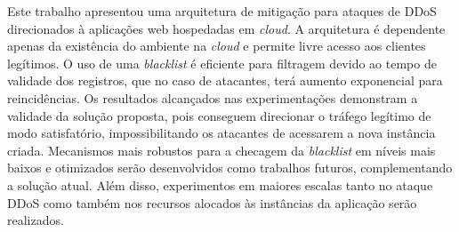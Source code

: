 
Este trabalho apresentou uma arquitetura de mitigação para ataques de DDoS direcionados à aplicações web hospedadas em \emph{cloud}. A arquitetura é dependente apenas da existência do ambiente na \emph{cloud} e permite livre acesso aos clientes legítimos. O uso de uma \emph{blacklist} é eficiente para filtragem devido ao tempo de validade dos registros, que no caso de atacantes, terá aumento exponencial para reincidências. 
%
Os resultados alcançados nas experimentações demonstram a validade da solução proposta, pois conseguem direcionar o tráfego legítimo de modo satisfatório, impossibilitando os atacantes de acessarem a nova instância criada. Mecanismos mais robustos para a checagem da \emph{blacklist} em níveis mais baixos e otimizados serão desenvolvidos como trabalhos futuros, complementando a solução atual. Além disso, experimentos em maiores escalas tanto no ataque DDoS como também nos recursos alocados às instâncias da aplicação serão realizados.

